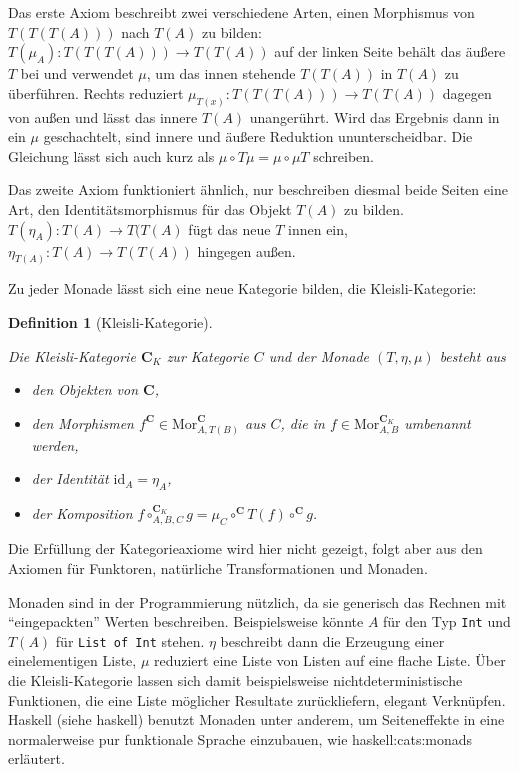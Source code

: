 \documentclass[12pt, a4paper, bibgerm]{scrbook}
\newcommand\icode[1]{\lstinline?#1?}
\newcommand\cref{}
\newcommand\sref{}
\newcommand\ato{\rightarrow} %
\newtheorem{defini}{Definition}
\newcommand{\defi}[2]{%
  \begin{defini}[#1]
    \label{def:#1}
    #2
  \end{defini}
}
\newcommand{\seec}[1]{(siehe \cref{#1})}
\begin{document}
Das erste Axiom beschreibt zwei verschiedene Arten, einen Morphismus von
$T(T(T(A)))$ nach $T(A)$ zu bilden: $T(\mu_A):T(T(T(A))) \ato T(T(A))$
auf der linken Seite behält das äußere $T$ bei und verwendet $\mu$, um
das innen stehende $T(T(A))$ in $T(A)$ zu überführen. Rechts reduziert
$\mu_{T(x)}:T(T(T(A))) \ato T(T(A))$ dagegen von außen und lässt das
innere $T(A)$ unangerührt. Wird das Ergebnis dann in ein $\mu$
geschachtelt, sind innere und äußere Reduktion ununterscheidbar. Die
Gleichung lässt sich auch kurz als $\mu \circ T \mu = \mu \circ \mu T$
schreiben.

Das zweite Axiom funktioniert ähnlich, nur beschreiben diesmal beide
Seiten eine Art, den Identitätsmorphismus für das Objekt $T(A)$ zu
bilden. $T(\eta_A):T(A) \ato T(T(A)$ fügt das neue $T$ innen ein,
$\eta_{T(A)}:T(A) \ato T(T(A))$ hingegen außen.

Zu jeder Monade lässt sich eine neue Kategorie bilden, die Kleisli-Kategorie:
\defi{Kleisli-Kategorie}{
Die Kleisli-Kategorie $\mathbf{C}_K$ zur Kategorie $C$ und der
Monade $(T,\eta,\mu)$ besteht aus
\begin{itemize}
\item den Objekten von $\mathbf{C}$,
\item den Morphismen $f^{\mathbf{C}} \in
  \mathrm{Mor}^{\mathbf{C}}_{A,T(B)}$ aus $C$, die in $f \in
  \mathrm{Mor}^{\mathbf{C}_K}_{A,B}$ umbenannt werden,
\item der Identität $\mathrm{id}_A = \eta_A$,
\item der Komposition $f \circ^{\mathbf{C}_K}_{A,B,C} g = \mu_C
  \circ^{\mathbf{C}} T(f) \circ^{\mathbf{C}} g$.
\end{itemize}
}
Die Erfüllung der Kategorieaxiome wird hier nicht gezeigt, folgt aber
aus den Axiomen für Funktoren, natürliche Transformationen und Monaden.

Monaden sind in der Programmierung nützlich, da sie generisch das
Rechnen mit "`eingepackten"' Werten beschreiben. Beispielsweise könnte
$A$ für den Typ \icode{Int} und $T(A)$ für \icode{List of Int}
stehen. $\eta$ beschreibt dann die Erzeugung einer einelementigen Liste,
$\mu$ reduziert eine Liste von Listen auf eine flache Liste. Über die
Kleisli-Kategorie lassen sich damit beispielsweise nichtdeterministische
Funktionen, die eine Liste möglicher Resultate zurückliefern, elegant
Verknüpfen. Haskell \seec{haskell} benutzt Monaden unter
anderem, um Seiteneffekte in eine normalerweise pur funktionale Sprache
einzubauen, wie \sref{haskell:cats:monads} erläutert.
\end{document}
